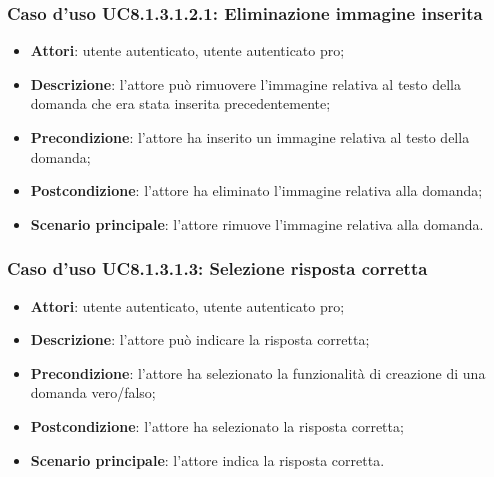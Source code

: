 	\subsubsection{Caso d'uso UC8.1.3.1.2.1: Eliminazione immagine inserita}
		\begin{itemize}
		\item
			\textbf{Attori}: utente autenticato, utente autenticato pro;
		\item		
			\textbf{Descrizione}: l'attore può rimuovere l'immagine relativa al testo della domanda che era stata inserita precedentemente;
		\item
			\textbf{Precondizione}: l'attore ha inserito un immagine relativa al testo della domanda;
		\item
			\textbf{Postcondizione}: l'attore ha eliminato l'immagine relativa alla domanda;
		\item
			\textbf{Scenario principale}: l'attore rimuove l'immagine relativa alla domanda. 
		\end{itemize}

\subsubsection{Caso d'uso UC8.1.3.1.3: Selezione risposta corretta}
	\begin{itemize}
		\item
			\textbf{Attori}: utente autenticato, utente autenticato pro;
		\item		
			\textbf{Descrizione}: l'attore può indicare la risposta corretta;
		\item
			\textbf{Precondizione}: l'attore ha selezionato la funzionalità di creazione di una domanda vero/falso; 
		\item
			\textbf{Postcondizione}: l'attore ha selezionato la risposta corretta;
		\item
			\textbf{Scenario principale}: l'attore indica la risposta corretta.  			
	\end{itemize}